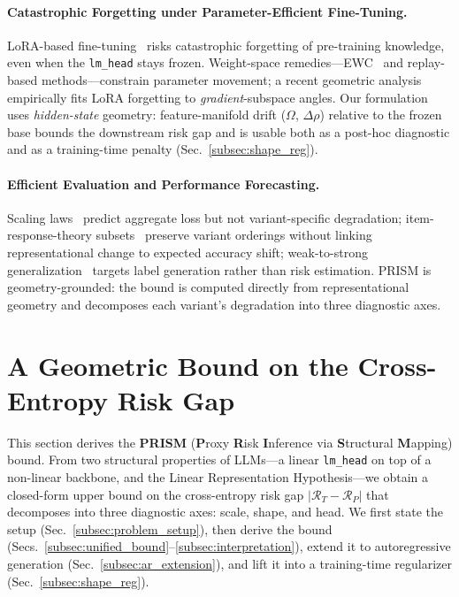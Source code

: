 \documentclass{article}
\begin{document}
\paragraph{Catastrophic Forgetting under Parameter-Efficient Fine-Tuning.}
LoRA-based fine-tuning~\cite{hu2022lora} risks catastrophic forgetting of pre-training knowledge, even when the \texttt{lm\_head} stays frozen. Weight-space remedies---EWC~\cite{kirkpatrick2017overcoming} and replay-based methods---constrain parameter movement; a recent geometric analysis~\cite{steele2026subspace} empirically fits LoRA forgetting to \emph{gradient}-subspace angles. Our formulation uses \emph{hidden-state} geometry: feature-manifold drift ($\Omega$, $\Delta\rho$) relative to the frozen base bounds the downstream risk gap and is usable both as a post-hoc diagnostic and as a training-time penalty (Sec.~\ref{subsec:shape_reg}).

\paragraph{Efficient Evaluation and Performance Forecasting.}
Scaling laws~\cite{kaplan2020scaling, hoffmann2022training} predict aggregate loss but not variant-specific degradation; item-response-theory subsets~\cite{polo2024tinybenchmarks, perlitz2024efficient} preserve variant orderings without linking representational change to expected accuracy shift; weak-to-strong generalization~\cite{burns2023weak} targets label generation rather than risk estimation. PRISM is geometry-grounded: the bound is computed directly from representational geometry and decomposes each variant's degradation into three diagnostic axes.



\section{A Geometric Bound on the Cross-Entropy Risk Gap}
\label{sec:geometric_foundation}

This section derives the \textbf{PRISM} (\textbf{P}roxy \textbf{R}isk \textbf{I}nference via \textbf{S}tructural \textbf{M}apping) bound. From two structural properties of LLMs---a linear \texttt{lm\_head} on top of a non-linear backbone, and the Linear Representation Hypothesis---we obtain a closed-form upper bound on the cross-entropy risk gap $|\mathcal{R}_T - \mathcal{R}_P|$ that decomposes into three diagnostic axes: scale, shape, and head. We first state the setup (Sec.~\ref{subsec:problem_setup}), then derive the bound (Secs.~\ref{subsec:unified_bound}--\ref{subsec:interpretation}), extend it to autoregressive generation (Sec.~\ref{subsec:ar_extension}), and lift it into a training-time regularizer (Sec.~\ref{subsec:shape_reg}).
\end{document}
